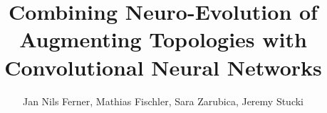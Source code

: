 \documentclass[]{article}
\title{Combining Neuro-Evolution of Augmenting Topologies with Convolutional Neural Networks}
\author{Jan Nils Ferner, Mathias Fischler, Sara Zarubica, Jeremy Stucki}
\begin{document}
\maketitle
\newpage

\begin{abstract}
	
	\newpage
	
\end{abstract}

	\tableofcontents
	\newpage

	
	

	\newpage

	\nocite{*}
	{\RaggedRight
		
		
	}
\end{document}
